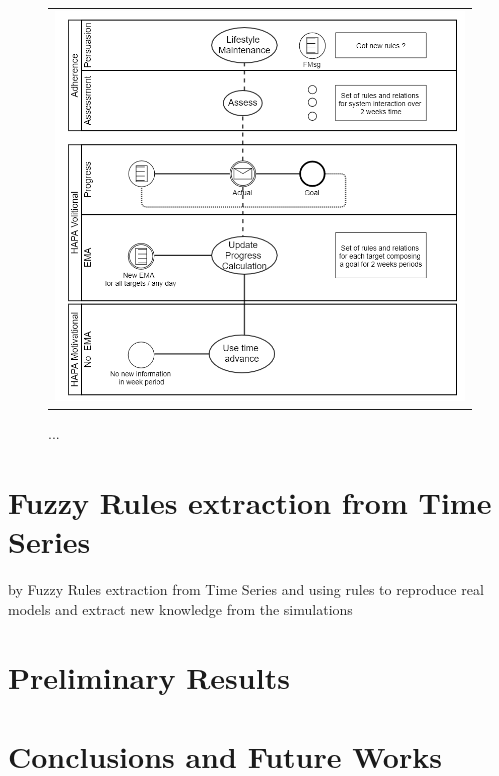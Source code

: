 \documentclass{llncs}
\begin{document}
\begin{figure}
  \begin{center}
  \begin{tabular}{c}
    \includegraphics[scale=0.5]{Hapa.png}\\
    \end{tabular}
    \caption{...}
     \label{Fig.hapa}
\end{center}
\end{figure} 

\section {Fuzzy Rules extraction from Time Series}
\label{sec.rules}
by Fuzzy Rules extraction from Time Series and using rules to reproduce real models and extract new knowledge from the simulations

\section {Preliminary Results}
\label{sec.results}

\vspace*{-\baselineskip}\vspace*{-\baselineskip}\vspace*{-\baselineskip}\section {Conclusions and Future Works}
\label{sec.conclusions}
\end{document}
